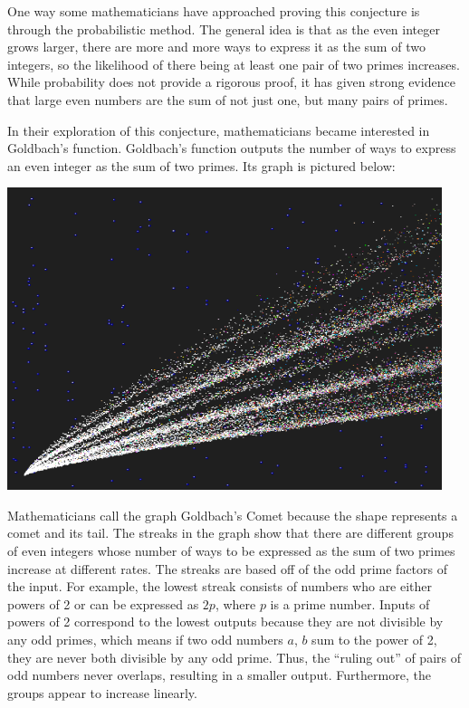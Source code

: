 \documentclass{article}
\begin{document}
One way some mathematicians have approached proving this conjecture is through the probabilistic method. The general idea is that as the even integer grows larger, there are more and more ways to express it as the sum of two integers, so the likelihood of there being at least one pair of two primes increases. While probability does not provide a rigorous proof, it has given strong evidence that large even numbers are the sum of not just one, but many pairs of primes.

In their exploration of this conjecture, mathematicians became interested in Goldbach’s function. Goldbach’s function outputs the number of ways to express an even integer as the sum of two primes. Its graph is pictured below:
\begin{center}
    \includegraphics[width=5in]{images/goldbach-comet.png}
\end{center}
Mathematicians call the graph Goldbach’s Comet because the shape represents a comet and its tail. The streaks in the graph show that there are different groups of even integers whose number of ways to be expressed as the sum of two primes increase at different rates. The streaks are based off of the odd prime factors of the input. For example, the lowest streak consists of numbers who are either powers of 2 or can be expressed as $2p$, where $p$ is a prime number. Inputs of powers of 2 correspond to the lowest outputs because they are not divisible by any odd primes, which means if two odd numbers $a$, $b$ sum to the power of 2, they are never both divisible by any odd prime. Thus, the “ruling out” of pairs of odd numbers never overlaps, resulting in a smaller output. Furthermore, the groups appear to increase linearly.
\end{document}
